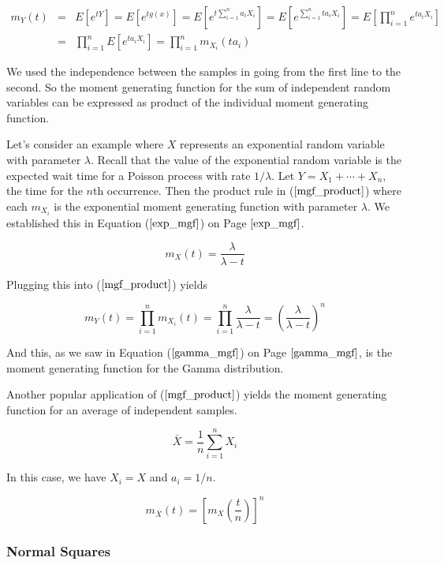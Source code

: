 \documentclass[]{article}
\begin{document}
\begin{eqnarray}
m_Y(t) &= & E \left[ e^{tY} \right] 
  =  E \left[ e^{tg(x)} \right] 
  = E \left[ e^{t \sum_{i=1}^n a_i X_i} \right]
  = E \left[ e^{\sum_{i=1}^n t a_i X_i} \right]
  = E \left[ \prod_{i=1}^n e^{t a_i X_i} \right] \nonumber \\
  &= & \prod_{i=1}^n E \left[ e^{t a_i X_i} \right]
  = \prod_{i=1}^n m_{X_i}(t a_i) \label{mgf_product}
\end{eqnarray}

We used the independence between the samples in going from the
first line to the second.
So the moment generating function for the sum of independent 
random variables can be expressed as product of the individual
moment generating function.

Let's consider an example where $X$ represents an exponential
random variable with parameter $\lambda$.  Recall that the
value of the exponential random variable is the expected wait
time for a Poisson process with rate $1/\lambda$.  Let
$Y = X_1 + \cdots + X_n$, the time for the $n$th occurrence.
Then the product rule in ($\ref{mgf_product}$) where each
$m_{X_i}$ is the exponential moment generating function with
parameter $\lambda$.  We established this in
Equation ($\ref{exp_mgf}$) on Page $\pageref{exp_mgf}$.

$$
m_X(t) = \frac{\lambda}{\lambda - t}
$$

Plugging this into ($\ref{mgf_product}$) yields

$$
m_Y(t) = \prod_{i=1}^n m_{X_i}(t)
  = \prod_{i=1}^n \frac{\lambda}{\lambda - t}
  = \left( \frac{\lambda}{\lambda - t} \right)^n
$$

And this, as we saw in Equation ($\ref{gamma_mgf}$) on
Page $\pageref{gamma_mgf}$, is the moment generating
function for the Gamma distribution.

Another popular application of ($\ref{mgf_product}$)
yields the moment generating function for an average of
independent samples.

$$
\bar{X} = \frac{1}{n} \sum_{i=1}^n X_i
$$

In this case, we have $X_i = X$ and $a_i = 1/n$.

\begin{equation}
m_{\bar{X}}(t) = \left[ m_X \left( \frac{t}{n} \right) \right]^n
\end{equation}

\subsubsection{Normal Squares} \label{sec:normal-squares}
\end{document}

